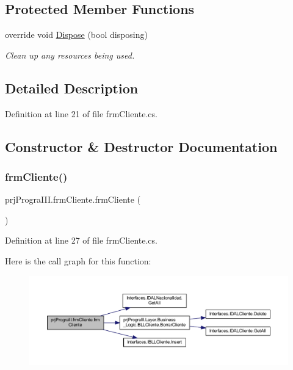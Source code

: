 \subsection*{Protected Member Functions}
\begin{DoxyCompactItemize}
\item 
override void \hyperlink{classprj_progra_i_i_i_1_1frm_cliente_aad5a3a46965d869e2acb805f557a8cc5}{Dispose} (bool disposing)
\begin{DoxyCompactList}\small\item\em Clean up any resources being used. \end{DoxyCompactList}\end{DoxyCompactItemize}


\subsection{Detailed Description}


Definition at line 21 of file frm\+Cliente.\+cs.



\subsection{Constructor \& Destructor Documentation}
\hypertarget{classprj_progra_i_i_i_1_1frm_cliente_aba05e78333e17b49180377bbcb2f358f}{}\label{classprj_progra_i_i_i_1_1frm_cliente_aba05e78333e17b49180377bbcb2f358f} 
\subsubsection{\texorpdfstring{frm\+Cliente()}{frmCliente()}}
{\footnotesize\ttfamily prj\+Progra\+I\+I\+I.\+frm\+Cliente.\+frm\+Cliente (\begin{DoxyParamCaption}{ }\end{DoxyParamCaption})}



Definition at line 27 of file frm\+Cliente.\+cs.

Here is the call graph for this function\+:
\nopagebreak
\begin{figure}[H]
\begin{center}
\leavevmode
\includegraphics[width=350pt]{classprj_progra_i_i_i_1_1frm_cliente_aba05e78333e17b49180377bbcb2f358f_cgraph}
\end{center}
\end{figure}



